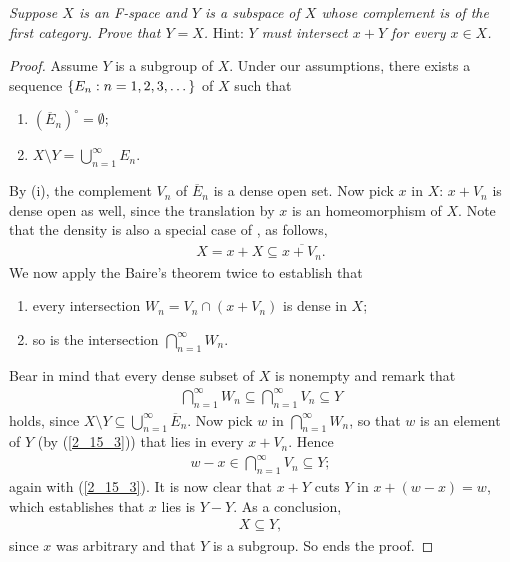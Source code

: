 \textit{%
Suppose $X$ is an F-space and $Y$ is a subspace of $X$ %
whose complement is of the first category. %
Prove that $Y=X$. }Hint: \textit{%
%
  $Y$ must intersect $x+Y$ for every $x\in X$. %
%
}
%
\begin{proof} Assume $Y$ is a subgroup of $X$. %
Under our assumptions, %
there exists a sequence $\{E_n: n=1, 2, 3, \dots\}$ of $X$ such that %
%
  \renewcommand{\labelenumi}{(\roman{enumi})} 
  \begin{enumerate}
    \item ${(\overline{E}_n)}^\circ=\emptyset ;$
    \item $X\setminus Y = \displaystyle{\bigcup_{n=1}^\infty  E_n}$.
  \end{enumerate}
%
By (i), the complement $V_n$ of $\overline{E}_n$ is a dense open set. %
Now pick $x$ in $X$: $x + V_n$ is dense open as well, 
since the translation by $x$ is an homeomorphism of $X$. %
%
Note that the density is also a special case of , as follows, %
%
\begin{align}\label{2_15_2}
  X = x + X \subseteq \overline{x + V_n}.
\end{align} 
%
We now apply the Baire's theorem twice to establish that %
%
\begin{enumerate}
  \item every intersection $W_n = V_n \cap (x+V_n)$ is dense in $X$;
  \item so is the intersection $\displaystyle{\bigcap_{n=1}^\infty W_n}$.
\end{enumerate}
%
Bear in mind that every dense subset of $X$ is nonempty and remark that %
\begin{align}\label{2_15_3}
  \bigcap_{n=1}^\infty W_n \subseteq \bigcap_{n=1}^\infty V_n \subseteq Y
\end{align} 
holds, since %
%
  $X\setminus Y \subseteq \bigcup_{n=1}^\infty \overline{E}_n$. %
%
Now pick $w$ in $\bigcap_{n=1}^\infty W_n$, so that %
$w$ is an element of $Y$ (by (\ref{2_15_3})) that lies in every $x + V_n$. %
Hence %
%
\begin{align}
  w - x \in \bigcap_{n=1}^\infty V_n \subseteq Y; 
\end{align}
%
again with (\ref{2_15_3}).
It is now clear that $x + Y$ cuts $Y$ in $x + (w - x ) = w$, which establishes that $x$ lies is $Y - Y$. %
As a conclusion, 
\begin{align}
  X \subseteq Y,  
\end{align}
%
since $x$ was arbitrary and that $Y$ is a subgroup. %
So ends the proof.
%
%
%
%
\end{proof}
\renewcommand{\labelenumi}{(\alph{enumi})} 
%
